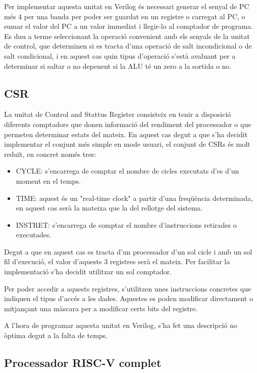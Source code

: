 \documentclass[10pt,a4paper,twocolumn,twoside]{article}
\begin{document}
    Per implementar aquesta unitat en Verilog és necessari generar el senyal de PC més 4 per una banda per poder ser guardat en un registre o carregat al PC, o sumar el valor del PC a un valor immediat i llegir-lo al comptador de programa. Es duu a terme seleccionant la operació convenient amb els senyals de la unitat de control, que determinen si es tracta d'una operació de salt incondicional o de salt condicional, i en aquest cas quin tipus d'operació s'està avaluant per a determinar si saltar o no depenent si la ALU té un zero a la sortida o no.
    
    
    \subsection{CSR}
    La unitat de Control and Stattus Register consisteix en tenir a disposició diferents comptadors que donen informació del rendiment del processador o que permeten determinar estats del mateix. 
    En aquest cas degut a que s'ha decidit implementar el conjunt més simple en mode usuari, el conjunt de CSRs és molt reduït, en concret només tres: 
    \begin{itemize}
        \item CYCLE: s'encarrega de comptar el nombre de cicles executats d'es d'un moment en el temps.
        \item TIME: aquest és un "real-time clock" a partir d'una freqüència determinada, en aquest cas serà la mateixa que la del rellotge del sistema.
        \item INSTRET: s'encarrega de comptar el nombre d'instruccions retirades o executades.
    \end{itemize}
    
    Degut a que en aquest cas es tracta d'un processador d'un sol cicle i amb un sol fil d'execució, el valor d'aquests 3 registres serà el mateix. Per facilitar la implementació s'ha decidit utilitzar un sol comptador.
    
    Per poder accedir a aquests registres, s'utilitzen unes instruccions concretes que indiquen el tipus d'accés a les dades. Aquestes es poden modificar directament o mitjançant una màscara per a modificar certs bits del registre.
    
    A l'hora de programar aquesta unitat en Verilog, s'ha fet una descripció no òptima degut a la falta de temps.
    

    
    \subsection{Processador RISC-V complet}
    
\end{document}
